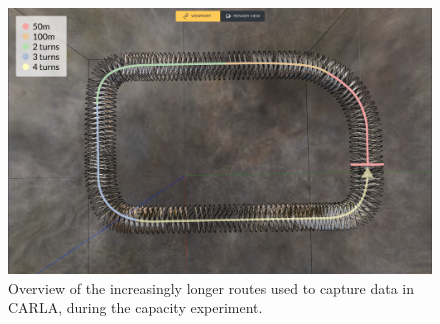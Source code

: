 \begin{figure}[!h]
    \centering
    \includegraphics[width=1.0\textwidth]{figures/capacity-overview.png}
    \caption{Overview of the increasingly longer routes used to capture data in CARLA, during the capacity experiment.}
    \label{fig:capacity-overview}
\end{figure}